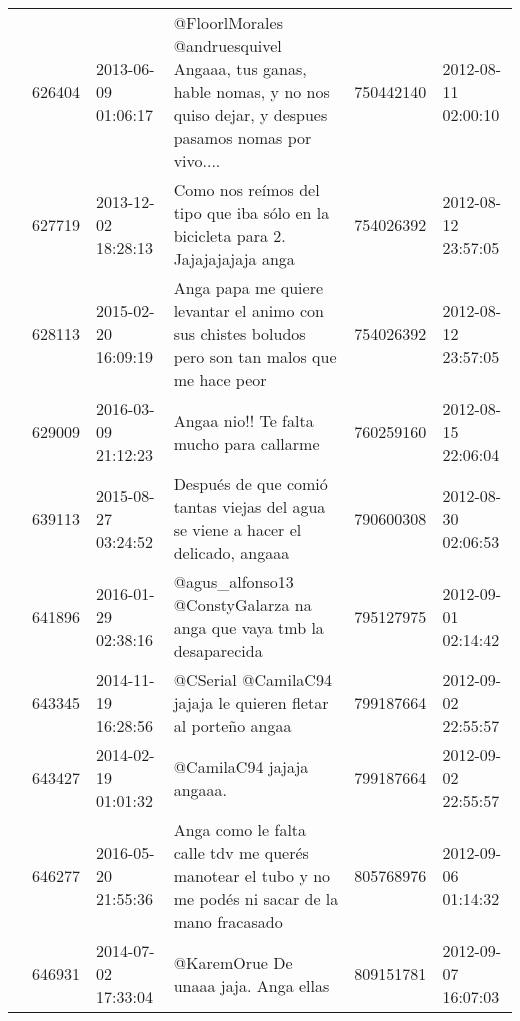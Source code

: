 \begin{tabular}{llllrl}
           & 626404  & 2013-06-09 01:06:17 &                     @FloorlMorales @andruesquivel Angaaa, tus ganas, hable nomas, y no nos quiso dejar, y despues pasamos nomas por vivo.... &   750442140 & 2012-08-11 02:00:10 \\
           & 627719  & 2013-12-02 18:28:13 &                                                              Como nos reímos del tipo que iba sólo en la bicicleta para 2. Jajajajajaja anga &   754026392 & 2012-08-12 23:57:05 \\
           & 628113  & 2015-02-20 16:09:19 &                                            Anga papa me quiere levantar el animo con sus chistes boludos pero son tan malos que me hace peor &   754026392 & 2012-08-12 23:57:05 \\
           & 629009  & 2016-03-09 21:12:23 &                                                                                                   Angaa nio!! Te falta mucho para callarme 👊 &   760259160 & 2012-08-15 22:06:04 \\
           & 639113  & 2015-08-27 03:24:52 &                                                             Después de que comió tantas viejas del agua se viene a hacer el delicado, angaaa &   790600308 & 2012-08-30 02:06:53 \\
           & 641896  & 2016-01-29 02:38:16 &                                                                          @agus\_alfonso13 @ConstyGalarza na anga que vaya tmb la desaparecida &   795127975 & 2012-09-01 02:14:42 \\
           & 643345  & 2014-11-19 16:28:56 &                                                                                @CSerial @CamilaC94 jajaja le quieren fletar al porteño angaa &   799187664 & 2012-09-02 22:55:57 \\
           & 643427  & 2014-02-19 01:01:32 &                                                                                                                    @CamilaC94 jajaja angaaa. &   799187664 & 2012-09-02 22:55:57 \\
           & 646277  & 2016-05-20 21:55:36 &                                          Anga como le falta calle tdv me querés manotear el tubo y no me podés ni sacar de la mano fracasado &   805768976 & 2012-09-06 01:14:32 \\
           & 646931  & 2014-07-02 17:33:04 &                                                                                                         @KaremOrue De unaaa jaja. Anga ellas &   809151781 & 2012-09-07 16:07:03 \\

\end{tabular}
